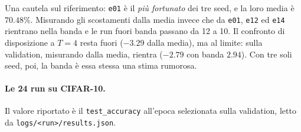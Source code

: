 \documentclass[
  11pt,
]{article}
\begin{document}
Una cautela sul riferimento: \texttt{e01} è il \emph{più fortunato} dei tre seed, e la loro media è $70.48\%$. Misurando gli scostamenti dalla media invece che da \texttt{e01}, \texttt{e12} ed \texttt{e14} rientrano nella banda e le run fuori banda passano da 12 a 10. Il confronto di disposizione a $T=4$ resta fuori ($-3.29$ dalla media), ma al limite: sulla validation, misurando dalla media, rientra ($-2.79$ con banda $2.94$). Con tre soli seed, poi, la banda è essa stessa una stima rumorosa.

\paragraph{Le 24 run su CIFAR-10.} Il valore riportato è il \texttt{test\_accuracy} all'epoca selezionata sulla validation, letto da \texttt{logs/<run>/results.json}.
\end{document}
